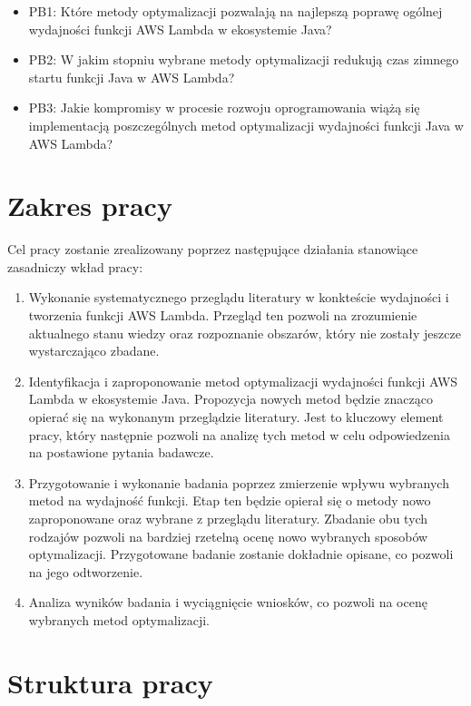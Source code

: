 \begin{itemize}
    \item PB1: Które metody optymalizacji pozwalają na najlepszą poprawę ogólnej wydajności funkcji AWS Lambda w ekosystemie Java?
    \item PB2: W jakim stopniu wybrane metody optymalizacji redukują czas zimnego startu funkcji Java w AWS Lambda?
    \item PB3: Jakie kompromisy w procesie rozwoju oprogramowania wiążą się implementacją poszczególnych metod optymalizacji wydajności funkcji Java w AWS Lambda?
\end{itemize}

\section*{Zakres pracy}\label{chapter:zakres_pracy}

Cel pracy zostanie zrealizowany poprzez następujące działania stanowiące zasadniczy wkład pracy:
\begin{enumerate}
    \item Wykonanie systematycznego przeglądu literatury w konkteście wydajności i tworzenia funkcji AWS Lambda. 
    Przegląd ten pozwoli na zrozumienie aktualnego stanu wiedzy oraz rozpoznanie obszarów, który nie zostały jeszcze wystarczająco zbadane. 
    \item Identyfikacja i zaproponowanie metod optymalizacji wydajności funkcji AWS Lambda w ekosystemie Java. 
    Propozycja nowych metod będzie znacząco opierać się na wykonanym przeglądzie literatury. 
    Jest to kluczowy element pracy, który następnie pozwoli na analizę tych metod w celu odpowiedzenia na postawione pytania badawcze.
    \item Przygotowanie i wykonanie badania poprzez zmierzenie wpływu wybranych metod na wydajność funkcji.
    Etap ten będzie opierał się o metody nowo zaproponowane oraz wybrane z przeglądu literatury.
    Zbadanie obu tych rodzajów pozwoli na bardziej rzetelną ocenę nowo wybranych sposobów optymalizacji.
    Przygotowane badanie zostanie dokładnie opisane, co pozwoli na jego odtworzenie.
    \item Analiza wyników badania i wyciągnięcie wniosków, co pozwoli na ocenę wybranych metod optymalizacji. 
\end{enumerate}

\section*{Struktura pracy}\label{chapter:struktura_pracy}

